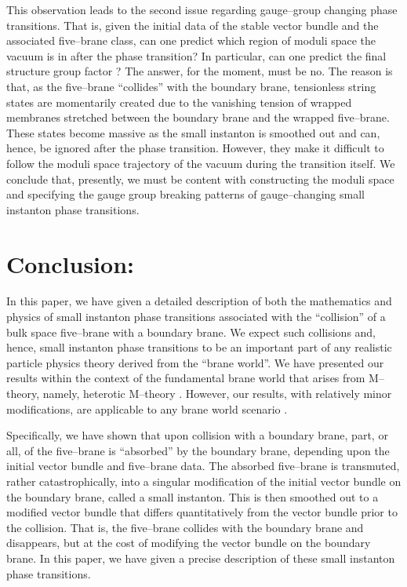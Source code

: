 \documentclass[a4paper,12pt]{article}
\numberwithin{equation}{section}
\theoremstyle{plain}
\begin{document}
This observation leads to the second issue regarding gauge--group changing
phase transitions. That is, given the initial data of the stable vector bundle
and the associated five--brane class, can one predict which region of moduli
space the vacuum is in after the phase transition? In particular, can one predict
the final structure group factor \coordHE{}? The answer, for the moment, must be
no. The reason is that, as the five--brane ``collides'' with the boundary
brane, tensionless string states are momentarily created due to the vanishing
tension of wrapped membranes stretched between the boundary brane and the
wrapped five--brane. These states become massive as the small instanton is
smoothed out and can, hence, be ignored after the phase transition. However,
they make it difficult to follow the moduli space trajectory of the vacuum
during the transition itself. We conclude that, presently, we must be content
with constructing the moduli space and specifying the gauge group breaking
patterns of gauge--changing small instanton phase transitions.


\section{Conclusion:}


In this paper, we have given a detailed description of both the mathematics
and physics of small instanton phase transitions associated with the
``collision'' of a bulk space five--brane with a boundary brane. We expect
such collisions and, hence, small instanton phase transitions 
to be an important part of any
realistic particle physics theory derived from the ``brane world''. We have
presented our results within the context of the fundamental brane world 
that arises from M--theory, namely, 
heterotic M--theory \cite{losw1, losw2, nse}. 
However, our results, with relatively minor modifications, are applicable to
any brane world scenario \cite{RS,dim, KT}. 

Specifically, we have shown that upon collision with a boundary brane, part,
or all, of the five--brane is ``absorbed'' by the boundary brane, depending
upon the initial vector bundle and five--brane data. 
The absorbed five--brane is transmuted,
rather catastrophically, into a singular modification of the initial 
vector bundle on the boundary brane, called a small instanton. 
This is then smoothed out to a modified vector bundle that differs
quantitatively from the vector bundle prior to the collision. That is, the
five--brane collides with the boundary brane and disappears, but at the cost
of modifying the vector bundle on the boundary brane. In this paper, 
we have given a precise description of these small instanton phase transitions.
\end{document}
